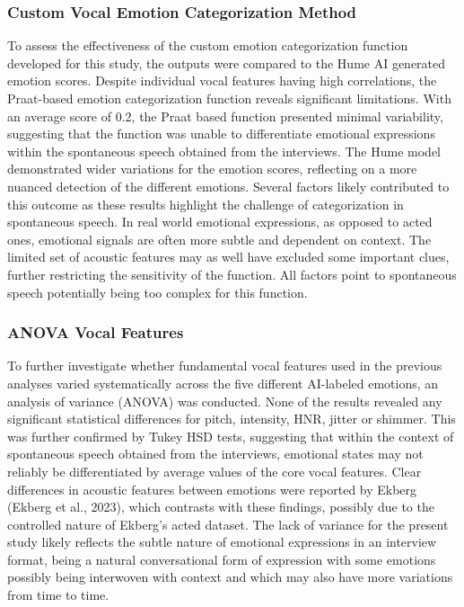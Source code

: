 \subsubsection{Custom Vocal Emotion Categorization Method}
To assess the effectiveness of the custom emotion categorization function developed for this study, the outputs were compared to the Hume AI generated emotion scores.
Despite individual vocal features having high correlations, the Praat-based emotion categorization function reveals significant limitations. With an average score of 0.2, the Praat based function presented minimal variability, suggesting that the function was unable to differentiate emotional expressions within the spontaneous speech obtained from the interviews.
The Hume model demonstrated wider variations for the emotion scores, reflecting on a more nuanced detection of the different emotions. 
Several factors likely contributed to this outcome as these results highlight the challenge of categorization in spontaneous speech. In real world emotional expressions, as opposed to acted ones, emotional signals are often more subtle and dependent on context. 
The limited set of acoustic features may as well have excluded some important clues, further restricting the sensitivity of the function. All factors point to spontaneous speech potentially being too complex for this function.

\subsubsection{ANOVA Vocal Features}
To further investigate whether fundamental vocal features used in the previous analyses varied systematically across the five different AI-labeled emotions, an analysis of variance (ANOVA) was conducted. None of the results revealed any significant statistical differences for pitch, intensity, HNR, jitter or shimmer. This was further confirmed by Tukey HSD tests, suggesting that within the context of spontaneous speech obtained from the interviews, emotional states may not reliably be differentiated by average values of the core vocal features.
Clear differences in acoustic features between emotions were reported by Ekberg (Ekberg et al., 2023), which contrasts with these findings, possibly due to the controlled nature of Ekberg’s acted dataset.
The lack of variance for the present study likely reflects the subtle nature of emotional expressions in an interview format, being a natural conversational form of expression with some emotions possibly being interwoven with context and which may also have more variations from time to time.

